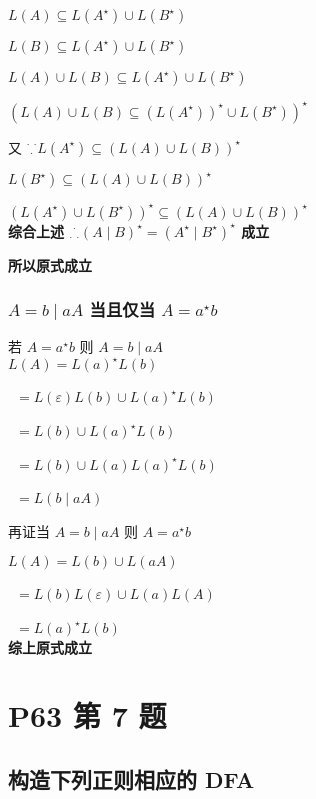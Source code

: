 \documentclass[12pt, a4paper]{article}
\begin{document}
    {$L(A) \subseteq L(A^{\star}) \cup L(B^{\star})$}

    {$L(B) \subseteq L(A^{\star}) \cup L(B^{\star})$}

    {$L(A) \cup L(B) \subseteq L(A^{\star}) \cup L(B^{\star})$}

    {$(L(A) \cup L(B) \subseteq (L(A^{\star}))^{\star} \cup L(B^{\star}))^{\star}$}

    {又 ${}^\cdot{}_\cdot{}^\cdot L(A^{\star}) \subseteq (L(A) \cup L(B))^{\star}$}

    {\qquad$L(B^{\star}) \subseteq (L(A) \cup L(B))^{\star}$}

    {$(L(A^{\star}) \cup L(B^{\star}))^{\star} \subseteq (L(A) \cup L(B))^{\star}$}\\

    \textbf{综合上述 ${}_\cdot{}^\cdot{}_\cdot (A \mid B)^{\star} = (A^{\star} \mid B^{\star})^{\star}$ 成立}

    \textbf{所以原式成立}

    \subsubsection{$A = b \mid aA$ 当且仅当 $A = a^{\star}b$}

    {若 $A = a^{\star}b$ 则 $A = b \mid aA$}\\

    {$L(A) = L(a)^{\star}L(b)$}

    {\qquad\, $ = L(\varepsilon)L(b) \cup L(a)^{\star}L(b)$}

    {\qquad\, $ = L(b) \cup L(a)^{\star}L(b)$}

    {\qquad\, $ = L(b) \cup L(a)L(a)^{\star}L(b)$}

    {\qquad\, $ = L(b \mid aA)$}

    {再证当 $A = b \mid aA$ 则 $A = a^{\star}b$}

    {$L(A) = L(b) \cup L(aA)$}

    {\qquad\, $ = L(b)L(\varepsilon) \cup L(a)L(A)$}

    {\qquad\, $ = L(a)^{\star}L(b)$}\\

    \textbf{综上原式成立}

\section{P63 第 7 题}
    \subsection{构造下列正则相应的 DFA}
\end{document}
